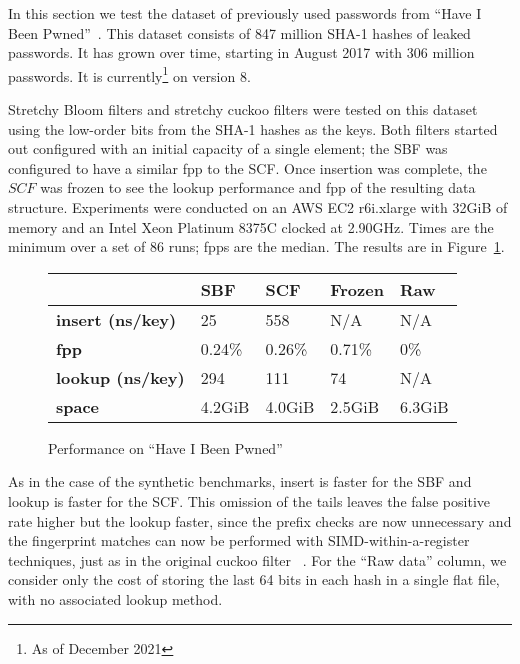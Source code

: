 \documentclass[letterpaper,twocolumn,10pt]{article}
\newcommand{\taffy}{stretchy}
\newcommand{\Taffy}{Stretchy}
\newcommand{\TBF}{SBF}
\newcommand{\TCF}{SCF}
\newcommand{\taffy}{taffy}
\newcommand{\Taffy}{Taffy}
\newcommand{\TBF}{TBF}
\newcommand{\TCF}{TCF}
\begin{document}
In this section we test the dataset of previously used passwords from ``Have I Been Pwned''~\cite{pwned}.
This dataset consists of 847 million SHA-1 hashes of leaked passwords.
It has grown over time, starting in August 2017 with 306 million passwords. It is currently\footnote{As of December 2021} on version 8.

\Taffy{} Bloom filters and \taffy{} cuckoo filters were tested on this dataset using the low-order bits from the SHA-1 hashes as the keys.
Both filters started out configured with an initial capacity of a single element; the \TBF{} was configured to have a similar fpp to the \TCF{}.
Once insertion was complete, the $\TCF{}$ was frozen to see the lookup performance and fpp of the resulting data structure.
Experiments were conducted on an AWS EC2 r6i.xlarge with 32GiB of memory and an Intel Xeon Platinum 8375C clocked at 2.90GHz.
Times are the minimum over a set of 86 runs; fpps are the median.
The results are in Figure~\ref{hibp-table}.

\begin{figure}[b!]
\begin{tabular}{|m{0.5in}|m{0.5in}|m{0.5in}|m{0.5in}|m{0.5in}|}
\hline & {\bf \TBF{}} & {\bf \TCF{}} & {\bf Frozen} & {\bf Raw}\\
\hline {\bf insert (ns/key)} & 25 & 558 & N/A & N/A\\
\hline {\bf fpp} & 0.24\% & 0.26\% & 0.71\% & 0\%\\
\hline {\bf lookup (ns/key)} & 294 & 111 & 74 & N/A\\
\hline {\bf space} & 4.2GiB & 4.0GiB & 2.5GiB & 6.3GiB\\
\hline
\end{tabular}
\caption{\label{hibp-table}
Performance on ``Have I Been Pwned''}
\end{figure}

As in the case of the synthetic benchmarks, insert is faster for the \TBF{} and lookup is faster for the \TCF{}.
This omission of the tails leaves the false positive rate higher but the lookup faster, since the prefix checks are now unnecessary and the fingerprint matches can now be performed with SIMD-within-a-register techniques, just as in the original cuckoo filter ~\cite{cuckoo-filter-github}.
For the ``Raw data'' column, we consider only the cost of storing the last 64 bits in each hash in a single flat file, with no associated lookup method.
\end{document}
